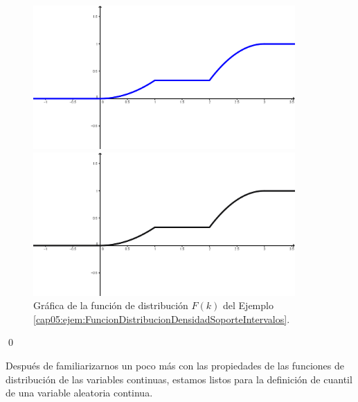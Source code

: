 \begin{ejemplo}
\begin{figure}[h!]
\begin{center}
\begin{enColor}
\includegraphics[width=10cm]{../fig/Cap05-EjemploFuncionDistribucionDensidadSoporteIntervalos02.png}
\end{enColor}
\begin{bn}
\includegraphics[width=10cm]{../fig/Cap05-EjemploFuncionDistribucionDensidadSoporteIntervalos02-bn.png}
\end{bn}
\caption{Gráfica de la función de distribución $F(k)$ del Ejemplo \ref{cap05:ejem:FuncionDistribucionDensidadSoporteIntervalos}.}
\label{cap05:fig:EjemploFuncionDistribucionDensidadSoporteIntervalos02}
\end{center}
\end{figure}
\qed
\end{ejemplo}
Después de familiarizarnos un poco más con las propiedades de las funciones de distribución de las variables continuas, estamos listos para la definición de {\sf cuantil} de una variable aleatoria continua.
    \begin{center}
    \end{center}
